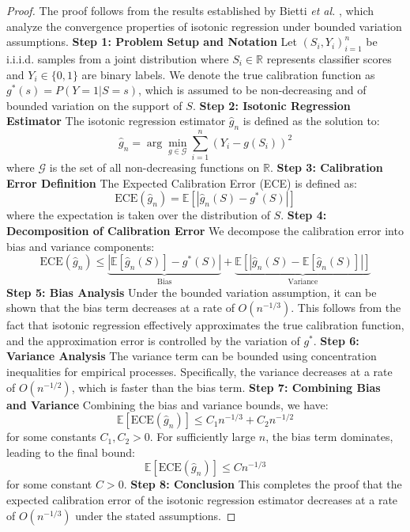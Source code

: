 \documentclass[12pt, a4paper]{article}
\begin{document}
\begin{proof}
The proof follows from the results established by Bietti \emph{et al.} \cite{bietti2021}, which analyze the convergence properties of isotonic regression under bounded variation assumptions. 
\textbf{Step 1: Problem Setup and Notation}
Let $(S_i, Y_i)_{i=1}^n$ be i.i.i.d. samples from a joint distribution where $S_i \in \mathbb{R}$ represents classifier scores and $Y_i \in \{0,1\}$ are binary labels. We denote the true calibration function as $g^*(s) = P(Y=1|S=s)$, which is assumed to be non-decreasing and of bounded variation on the support of $S$. 
\textbf{Step 2: Isotonic Regression Estimator}
The isotonic regression estimator $\hat{g}_n$ is defined as the solution to: 
$$\hat{g}_n = \arg\min_{g \in \mathcal{G}} \sum_{i=1}^n (Y_i - g(S_i))^2$$
where $\mathcal{G}$ is the set of all non-decreasing functions on $\mathbb{R}$.
\textbf{Step 3: Calibration Error Definition}
The Expected Calibration Error (ECE) is defined as:
$$\text{ECE}(\hat{g}_n) = \mathbb{E}\left[ | \hat{g}_n(S) - g^*(S) | \right]$$
where the expectation is taken over the distribution of $S$.
\textbf{Step 4: Decomposition of Calibration Error}
We decompose the calibration error into bias and variance components:
$$\text{ECE}(\hat{g}_n) \leq \underbrace{|\mathbb{E}[\hat{g}_n(S)] - g^*(S)|}_{\text{Bias}} + \underbrace{\mathbb{E}[|\hat{g}_n(S) - \mathbb{E}[\hat{g}_n(S)]|]}_{\text{Variance}}$$
\textbf{Step 5: Bias Analysis}
Under the bounded variation assumption, it can be shown that the bias term decreases at a rate of $O(n^{-1/3})$. This follows from the fact that isotonic regression effectively approximates the true calibration function, and the approximation error is controlled by the variation of $g^*$.
\textbf{Step 6: Variance Analysis}
The variance term can be bounded using concentration inequalities for empirical processes. Specifically, the variance decreases at a rate of $O(n^{-1/2})$, which is faster than the bias term. 
\textbf{Step 7: Combining Bias and Variance}
Combining the bias and variance bounds, we have:
$$\mathbb{E}[\text{ECE}(\hat{g}_n)] \leq C_1 n^{-1/3} + C_2 n^{-1/2}$$
for some constants $C_1, C_2 > 0$. For sufficiently large $n$, the bias term dominates, leading to the final bound:
$$\mathbb{E}[\text{ECE}(\hat{g}_n)] \leq C n^{-1/3}$$
for some constant $C > 0$.
\textbf{Step 8: Conclusion}
This completes the proof that the expected calibration error of the isotonic regression estimator decreases at a rate of $O(n^{-1/3})$ under the stated assumptions.
\end{proof}
\end{document}
